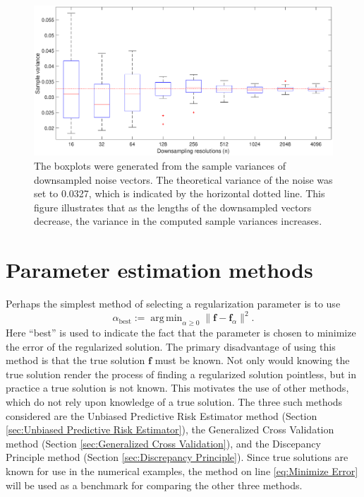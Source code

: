 \documentclass[12pt]{article}
\newcommand{\fVec}{\mathbf{f}}	%
\newcommand{\regparam}{\alpha}
\newcommand{\freg}{\fVec_{\regparam}}	%
\DeclareMathOperator*{\argmin}{arg\,min}
\begin{document}
\begin{figure}[htb]
\centerline{\includegraphics[scale=0.45]{Figures/VarPlot1D_F1_S05_W100_R20.eps}}
\caption{The boxplots were generated from the sample variances of downsampled noise vectors. The theoretical variance of the noise was set to 0.0327, which is indicated by the horizontal dotted line. This figure illustrates that as the lengths of the downsampled vectors decrease, the variance in the computed sample variances increases.}
\label{VarPlot1D}
\end{figure}

\section{Parameter estimation methods} \label{sec:Parameter estimation methods}

Perhaps the simplest method of selecting a regularization parameter is to use
\begin{equation}
\regparam_{\text{best}} := \argmin_{\regparam \geq 0} \|\fVec - \freg\|^2.
\label{eq:Minimize Error}
\end{equation}
Here ``best'' is used to indicate the fact that the parameter is chosen to minimize the error of the regularized solution. The primary disadvantage of using this method is that the true solution $\fVec$ must be known. Not only would knowing the true solution render the process of finding a regularized solution pointless, but in practice a true solution is not known. This motivates the use of other methods, which do not rely upon knowledge of a true solution. The three such methods considered are the Unbiased Predictive Risk Estimator method (Section \ref{sec:Unbiased Predictive Risk Estimator}), the Generalized Cross Validation method (Section \ref{sec:Generalized Cross Validation}), and the Discepancy Principle method (Section \ref{sec:Discrepancy Principle}). Since true solutions are known for use in the numerical examples, the method on line \eqref{eq:Minimize Error} will be used as a benchmark for comparing the other three methods.
\end{document}

